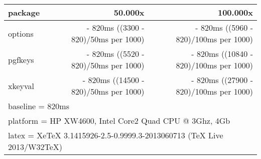 \documentclass{book}
\begin{document}
\makeatletter

\newcommand\preparetest[1]{
	\eifstrequal{#1}{options}{%
		\optionset{%
			/baz/bar-test/.new value = hi,
			/foo/.new family={/baz},
		}
		\def\test##1{\optionset{/foo,##1}}
		\def\valueof##1##2{\option{/##1/##2}}
	}
	{\eifstrequal{#1}{pgfkeys}{%
		\pgfkeys{%
			/baz/bar-test/.initial=hi,
			/foo/.is family,
			/foo/.search also={/baz},
		}
		\def\test##1{\pgfkeys{/foo,##1}}
		\def\valueof##1##2{\pgfkeysvalueof{/##1/##2}}
	}
	{\eifstrequal{#1}{xkeyval}{%
		\define@cmdkey{baz}{bar-test}{}%
		\define@cmdkey{foo}{x}{}%
		\def\test##1{\setkeys{foo,baz}{##1}}%
		\def\valueof##1##2{\csuse{cmdKV@##1@##2}}%
	}
	{\@latex@error{Cannot test package "#1"}}%
	}}%
}


\newcount\testcount
\newcommand\testten{%
  \test{bar-test={a test}}%
  \test{bar-test={a test}}%
  \test{bar-test={a test}}%
  \test{bar-test={a test}}%
  \test{bar-test={a test}}%
  \test{bar-test={a test}}%
  \test{bar-test={a test}}%
  \test{bar-test={a test}}%
  \test{bar-test={a test}}%
  \test{bar-test={a test}}%
  \test{bar-test={a test}}%
  \advance\testcount 1\relax
}

\newcommand\runtest[2][10000]{%
	\preparetest{#2}%
	\typeout{test "#2": (\the\numexpr#1 * 10\relax\space repetitions)}
	\testcount=0%
	\@whilenum\testcount<#1\do\testten
	\typeout{test "#2": "\valueof{baz}{bar-test}" (expected "a test")}
}

\iffalse

\else
\def\plaintime{820}
\newcommand\adjust[2][1]{\the\numexpr#2 - \plaintime\relax ms (\the\numexpr (#2 - \plaintime)/#1\relax ms per 1000)}

\begin{tabular}{lrr}
\textbf{package} & \textbf{50.000x} & \textbf{100.000x} \\ 
\hline
options & \adjust[50]{3300} & \adjust[100]{5960} \\
pgfkeys & \adjust[50]{5520} & \adjust[100]{10840} \\
xkeyval & \adjust[50]{14500} & \adjust[100]{27900} \\
\hline
\multicolumn{3}{l}{baseline = \plaintime ms} \\
\multicolumn{3}{l}{platform = HP XW4600, Intel Core2 Quad CPU @ 3Ghz, 4Gb} \\
\multicolumn{3}{l}{latex    = XeTeX 3.1415926-2.5-0.9999.3-2013060713 (TeX Live 2013/W32TeX)}\\
\end{tabular}
\fi
\end{document}
